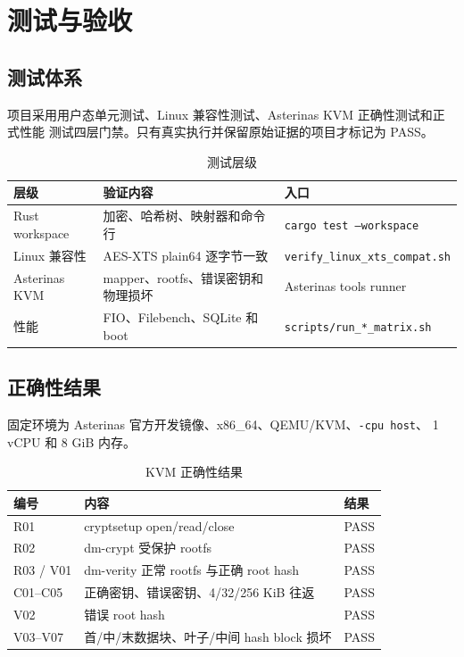 \chapter{测试与验收}

\section{测试体系}

项目采用用户态单元测试、Linux 兼容性测试、Asterinas KVM 正确性测试和正式性能
测试四层门禁。只有真实执行并保留原始证据的项目才标记为 PASS。

\begin{table}[H]
    \centering
    \caption{测试层级}
    \begin{tabular}{p{}p{}p{}}
        \toprule
        \textbf{层级} & \textbf{验证内容} & \textbf{入口} \\
        \midrule
        Rust workspace & 加密、哈希树、映射器和命令行 & \texttt{cargo test --workspace} \\
        Linux 兼容性 & AES-XTS plain64 逐字节一致 & \texttt{verify\_\allowbreak linux\_\allowbreak xts\_\allowbreak compat.sh} \\
        Asterinas KVM & mapper、rootfs、错误密钥和物理损坏 & Asterinas tools runner \\
        性能 & FIO、Filebench、SQLite 和 boot & \texttt{scripts/\allowbreak run\_*\_\allowbreak matrix.sh} \\
        \bottomrule
    \end{tabular}
\end{table}

\section{正确性结果}

固定环境为 Asterinas 官方开发镜像、x86\_64、QEMU/KVM、\texttt{-cpu host}、
1 vCPU 和 8 GiB 内存。

\begin{table}[H]
    \centering
    \caption{KVM 正确性结果}
    \begin{tabular}{p{}p{}p{}}
        \toprule
        \textbf{编号} & \textbf{内容} & \textbf{结果} \\
        \midrule
        R01 & cryptsetup open/read/close & PASS \\
        R02 & dm-crypt 受保护 rootfs & PASS \\
        R03 / V01 & dm-verity 正常 rootfs 与正确 root hash & PASS \\
        C01--C05 & 正确密钥、错误密钥、4/32/256 KiB 往返 & PASS \\
        V02 & 错误 root hash & PASS \\
        V03--V07 & 首/中/末数据块、叶子/中间 hash block 损坏 & PASS \\
        \bottomrule
    \end{tabular}
\end{table}

